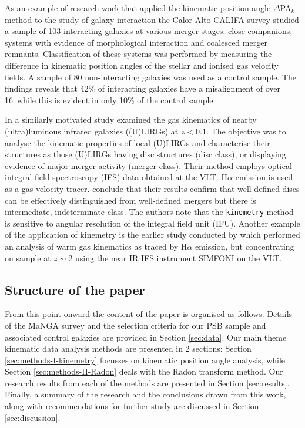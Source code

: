 As an example of research work that applied the kinematic position angle $\Delta$PA$_k$ method to the study of galaxy interaction the Calor Alto CALIFA survey \citet{2015A&A...582A..21B} studied a sample of 103 interacting galaxies at various merger stages: close companions, systems with evidence of morphological interaction and coalesced merger remnants. Classification of these systems was performed by measuring the difference in kinematic position angles of the stellar and ionised gas velocity fields. A sample of 80 non-interacting galaxies was used as a control sample. The findings reveals that 42\% of interacting galaxies have a misalignment of over 16\textdegree\ while this is evident in only 10\% of the control sample.

In a similarly motivated study \citet{2016A&A...591A..85B} examined the gas kinematics of nearby (ultra)luminous infrared galaxies ((U)LIRGs) at $z<0.1$. The objective was to analyse the kinematic properties of local (U)LIRGs and characterise their structures as those (U)LIRGs having disc structures (disc class), or displaying evidence of major merger activity (merger class). Their method employs optical integral field spectroscopy (IFS) data obtained at the VLT. H$\alpha$ emission is used as a gas velocity tracer. \citet{2016A&A...591A..85B} conclude that their results confirm that well-defined discs can be effectively distinguished from well-defined mergers but there is intermediate, indeterminate class. The authors note that the \texttt{kinemetry} method is sensitive to angular resolution of the integral field unit (IFU). Another example of the application of kinemetry is the earlier study conducted by \citet{2008ApJ...682..231S} which performed an  analysis of warm gas kinematics as traced by H$\alpha$ emission, but concentrating on sample at $z\sim2$ using the near IR IFS instrument SIMFONI on the VLT.

\subsection{Structure of the paper}
From this point onward the content of the paper is organised as follows: Details of the MaNGA survey and the selection criteria for our PSB sample and associated control galaxies are provided in Section \ref{sec:data}. Our main theme kinematic data analysis methods are presented in 2 sections: Section \ref{sec:methods-I-kinemetry} focusses on kinematic position angle analysis, while Section \ref{sec:methods-II-Radon} deals with the Radon transform method. Our research results from each of the methods are presented in Section \ref{sec:results}. Finally, a summary of the research and the conclusions drawn from this work, along with recommendations for further study are discussed in Section \ref{sec:discussion}.
